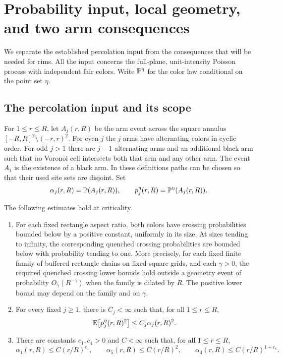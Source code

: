 \section{Probability input, local geometry, and two arm consequences}
\label{sec:probability}

We separate the established percolation input from the consequences that
will be needed for rims.  All the input concerns the full-plane,
unit-intensity Poisson process with independent fair colors.  Write
$\mathbb P^{\eta}$ for the color law conditional on the point set $\eta$.

\subsection{The percolation input and its scope}

For $1\le r\le R$, let $A_j(r,R)$ be the arm event across the square
annulus $[-R,R]^2\setminus(-r,r)^2$.  For even $j$ the $j$ arms have
alternating colors in cyclic order.  For odd $j>1$ there are $j-1$
alternating arms and an additional black arm such that no Voronoi cell
intersects both that arm and any other arm.  The event $A_1$ is the existence
of a black arm.  In these definitions paths can be chosen so that their
used site sets are disjoint.  Set
\[
 \alpha_j(r,R)=\mathbb P(A_j(r,R)),
 \qquad p_j^\eta(r,R)=\mathbb P^{\eta}(A_j(r,R)).
\]

\begin{proposition}\label{prop:probability-input}
The following estimates hold at criticality.
\begin{enumerate}[label=(\roman*)]
\item For each fixed rectangle aspect ratio, both colors have crossing
probabilities bounded below by a positive constant, uniformly in its
size.  At sizes tending to infinity, the corresponding quenched crossing
probabilities are bounded below with probability tending to one.
More precisely, for each fixed finite family of buffered rectangle chains
on fixed square grids, and each $\gamma>0$, the required quenched crossing
lower bounds hold outside a geometry event of probability
$O_\gamma(R^{-\gamma})$ when the family is dilated by $R$.  The positive
lower bound may depend on the family and on $\gamma$.
\item For every fixed $j\ge1$, there is $C_j<\infty$ such that, for all
$1\le r\le R$,
\begin{equation}\label{prob:quenched-arms}
 \mathbb E\bigl[p_j^\eta(r,R)^2\bigr]
       \le C_j\alpha_j(r,R)^2.
\end{equation}
\item There are constants $c_1,c_4>0$ and $C<\infty$ such that, for all
$1\le r\le R$,
\begin{equation}\label{prob:arm-powers}
 \alpha_1(r,R)\le C(r/R)^{c_1},\qquad
 \alpha_5(r,R)\le C(r/R)^2,\qquad
 \alpha_4(r,R)\le C(r/R)^{1+c_4}.
\end{equation}
\end{enumerate}
\end{proposition}

